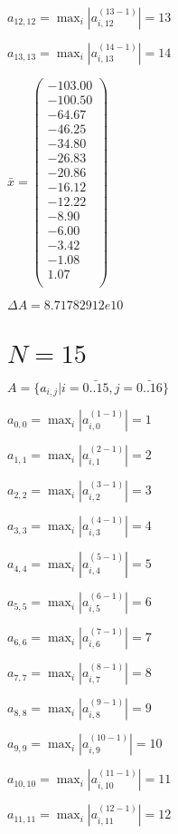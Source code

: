 \documentclass[a4paper,12pt]{article}
\begin{document}
$a _{ 12, 12 } =  \max _i |a _{ i, 12 } ^{ (13 - 1) } | = 13$

$a _{ 13, 13 } =  \max _i |a _{ i, 13 } ^{ (14 - 1) } | = 14$

$\bar { x } = \begin{pmatrix}
-103.00 \\
-100.50 \\
-64.67 \\
-46.25 \\
-34.80 \\
-26.83 \\
-20.86 \\
-16.12 \\
-12.22 \\
-8.90 \\
-6.00 \\
-3.42 \\
-1.08 \\
1.07 \\
\end{pmatrix}
$

$\Delta A = 8.71782912e10$



\section{ $N = 15$ }
$A = \{ a _{ i, j } | i = \bar { 0..15 }, j = \bar { 0..16 } \}$

$a _{ 0, 0 } =  \max _i |a _{ i, 0 } ^{ (1 - 1) } | = 1$

$a _{ 1, 1 } =  \max _i |a _{ i, 1 } ^{ (2 - 1) } | = 2$

$a _{ 2, 2 } =  \max _i |a _{ i, 2 } ^{ (3 - 1) } | = 3$

$a _{ 3, 3 } =  \max _i |a _{ i, 3 } ^{ (4 - 1) } | = 4$

$a _{ 4, 4 } =  \max _i |a _{ i, 4 } ^{ (5 - 1) } | = 5$

$a _{ 5, 5 } =  \max _i |a _{ i, 5 } ^{ (6 - 1) } | = 6$

$a _{ 6, 6 } =  \max _i |a _{ i, 6 } ^{ (7 - 1) } | = 7$

$a _{ 7, 7 } =  \max _i |a _{ i, 7 } ^{ (8 - 1) } | = 8$

$a _{ 8, 8 } =  \max _i |a _{ i, 8 } ^{ (9 - 1) } | = 9$

$a _{ 9, 9 } =  \max _i |a _{ i, 9 } ^{ (10 - 1) } | = 10$

$a _{ 10, 10 } =  \max _i |a _{ i, 10 } ^{ (11 - 1) } | = 11$

$a _{ 11, 11 } =  \max _i |a _{ i, 11 } ^{ (12 - 1) } | = 12$
\end{document}
